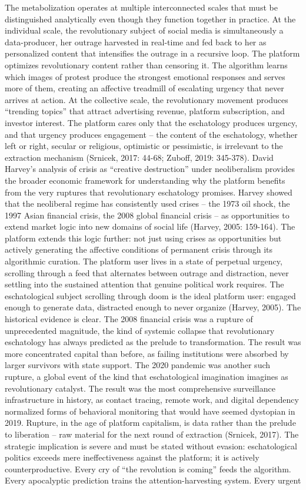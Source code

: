 The metabolization operates at multiple interconnected scales that must be distinguished analytically even though they function together in practice. At the individual scale, the revolutionary subject of social media is simultaneously a data-producer, her outrage harvested in real-time and fed back to her as personalized content that intensifies the outrage in a recursive loop. The platform optimizes revolutionary content rather than censoring it. The algorithm learns which images of protest produce the strongest emotional responses and serves more of them, creating an affective treadmill of escalating urgency that never arrives at action. At the collective scale, the revolutionary movement produces “trending topics” that attract advertising revenue, platform subscription, and investor interest. The platform cares only that the eschatology produces urgency, and that urgency produces engagement – the content of the eschatology, whether left or right, secular or religious, optimistic or pessimistic, is irrelevant to the extraction mechanism (Srnicek, 2017: 44-68; Zuboff, 2019: 345-378). David Harvey’s analysis of crisis as “creative destruction” under neoliberalism provides the broader economic framework for understanding why the platform benefits from the very ruptures that revolutionary eschatology promises. Harvey showed that the neoliberal regime has consistently used crises – the 1973 oil shock, the 1997 Asian financial crisis, the 2008 global financial crisis – as opportunities to extend market logic into new domains of social life (Harvey, 2005: 159-164). The platform extends this logic further: not just using crises as opportunities but actively generating the affective conditions of permanent crisis through its algorithmic curation. The platform user lives in a state of perpetual urgency, scrolling through a feed that alternates between outrage and distraction, never settling into the sustained attention that genuine political work requires. The eschatological subject scrolling through doom is the ideal platform user: engaged enough to generate data, distracted enough to never organize (Harvey, 2005). The historical evidence is clear. The 2008 financial crisis was a rupture of unprecedented magnitude, the kind of systemic collapse that revolutionary eschatology has always predicted as the prelude to transformation. The result was more concentrated capital than before, as failing institutions were absorbed by larger survivors with state support. The 2020 pandemic was another such rupture, a global event of the kind that eschatological imagination imagines as revolutionary catalyst. The result was the most comprehensive surveillance infrastructure in history, as contact tracing, remote work, and digital dependency normalized forms of behavioral monitoring that would have seemed dystopian in 2019. Rupture, in the age of platform capitalism, is data rather than the prelude to liberation – raw material for the next round of extraction (Srnicek, 2017). The strategic implication is severe and must be stated without evasion: eschatological politics exceeds mere ineffectiveness against the platform; it is actively counterproductive. Every cry of “the revolution is coming” feeds the algorithm. Every apocalyptic prediction trains the attention-harvesting system. Every urgent 